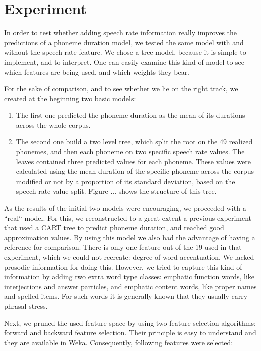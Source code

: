 \documentclass[a4paper]{scrreprt}
\begin{document}
\section{Experiment}
In order to test whether adding speech rate information really improves the predictions of a phoneme duration model, we tested the same model with and without the speech rate feature. We chose a tree model, because it is simple to implement, and to interpret. One can easily examine this kind of model to see which features are being used, and which weights they bear. 

For the sake of comparison, and to see whether we lie on the right track, we created at the beginning two basic models: 

\begin{enumerate}
	\item The first one predicted the phoneme duration as the mean of its durations across the whole corpus. 
	\item The second one build a two level tree, which split the root on the 49 realized phonemes, and then each phoneme on two specific speech rate values. The leaves contained three predicted values for each phoneme. These values were calculated using the mean duration of the specific phoneme across the corpus modified or not by a proportion of its standard deviation, based on the speech rate value split. Figure ... shows the structure of this tree. 
\end{enumerate}

As the results of the initial two models were encouraging, we proceeded with a ``real`` model. For this, we reconstructed to a great extent a previous experiment \cite{Brinckmann_2003} that used a CART tree to predict phoneme duration, and reached good approximation values. By using this model we also had the advantage of having a reference for comparison. There is only one feature out of the 19 used in that experiment, which we could not recreate: degree of word accentuation. We lacked prosodic information for doing this. However, we tried to capture this kind of information by adding two extra word type classes: emphatic function words, like interjections and answer particles, and emphatic content words, like proper names and spelled items. For such words it is generally known that they usually carry phrasal stress.

Next, we pruned the used feature space by using two feature selection algorithms: forward and backward feature selection. Their principle is easy to understand and they are available in Weka. Consequently, following features were selected:
\end{document}

